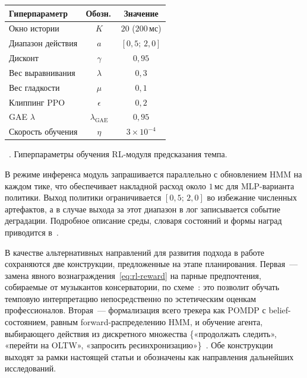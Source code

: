 \par\addvspace{2pt}
{\centering
{}%
\footnotesize
\begin{tabular}{@{}lcc@{}}
  \toprule
  Гиперпараметр                           & Обозн.\,         & Значение \\
  \midrule
  Окно истории                            & $K$              & $20$ ($200$\,мс) \\
  Диапазон действия                       & $a$              & $[0{,}5;\,2{,}0]$ \\
  Дисконт                                 & $\gamma$         & $0{,}95$ \\
  Вес выравнивания                        & $\lambda$        & $0{,}3$ \\
  Вес гладкости                           & $\mu$            & $0{,}1$ \\
  Клиппинг PPO                            & $\epsilon$       & $0{,}2$ \\
  GAE $\lambda$                           & $\lambda_{\text{GAE}}$ & $0{,}95$ \\
  Скорость обучения                       & $\eta$           & $3\!\times\!10^{-4}$ \\
  \bottomrule
\end{tabular}\par
\vspace{2pt}
\tablename~\thetable. Гиперпараметры обучения RL-модуля
предсказания темпа.\par}
\addvspace{4pt}

В режиме инференса модуль запрашивается параллельно с обновлением
HMM на каждом тике, что обеспечивает накладной расход около $1$\,мс
для MLP-варианта политики. Выход политики ограничивается
$[0{,}5;\,2{,}0]$ во избежание численных артефактов, а в случае
выхода за этот диапазон в лог записывается событие деградации.
Подробное описание среды, словаря состояний и формы наград приводится
в~.

В качестве альтернативных направлений для развития подхода в работе
сохраняются две конструкции, предложенные на этапе планирования.
Первая~--- замена явного вознаграждения~\eqref{eq:rl-reward} на
парные предпочтения, собираемые от музыкантов консерватории, по
схеме~\cite{Christiano2017Preference}: это позволит обучать темповую
интерпретацию непосредственно по эстетическим оценкам
профессионалов. Вторая~--- формализация всего трекера как POMDP с
belief-состоянием, равным forward-распределению HMM, и обучение
агента, выбирающего действия из дискретного множества \{«продолжать
следить», «перейти на OLTW», «запросить ресинхронизацию»\}~\cite{Kaelbling1998POMDP}.
Обе конструкции выходят за рамки настоящей статьи и обозначены как
направления дальнейших исследований.
